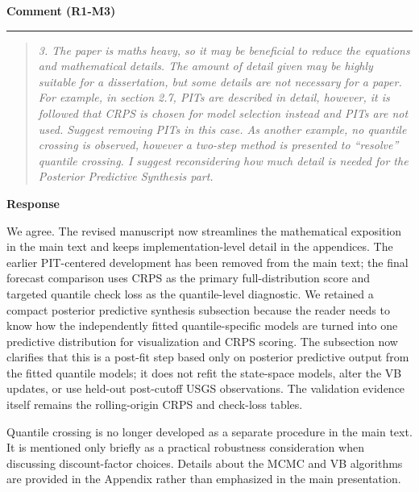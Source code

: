 \documentclass[11pt,letterpaper]{article}
\newcommand{\commentheading}[1]{%
  \vspace{6pt}\noindent\textbf{Comment (#1)}\par
  \vspace{2pt}\hrule\vspace{6pt}
}
\newenvironment{commentblock}{\begin{quote}\small\itshape}{\end{quote}}
\newcommand{\responseheading}{%
  \vspace{2pt}\noindent\textbf{Response}\par
}
\newenvironment{responsebox}{\begin{mdframed}[style=plainbox]}{\end{mdframed}}
\newcommand{\RoneM}[1]{R1-M#1}
\begin{document}
\commentheading{\RoneM{3}}
\begin{commentblock}
3. The paper is maths heavy, so it may be beneficial to reduce the equations and mathematical details. The amount of detail given may be highly suitable for a dissertation, but some details are not necessary for a paper. For example, in section 2.7, PITs are described in detail, however, it is followed that CRPS is chosen for model selection instead and PITs are not used. Suggest removing PITs in this case. As another example, no quantile crossing is observed, however a two-step method is presented to “resolve” quantile crossing. I suggest reconsidering how much detail is needed for the Posterior Predictive Synthesis part.
\end{commentblock}
\responseheading
\begin{responsebox}
We agree. The revised manuscript now streamlines the mathematical exposition in the main text and keeps implementation-level detail in the appendices. The earlier PIT-centered development has been removed from the main text; the final forecast comparison uses CRPS as the primary full-distribution score and targeted quantile check loss as the quantile-level diagnostic. We retained a compact posterior predictive synthesis subsection because the reader needs to know how the independently fitted quantile-specific models are turned into one predictive distribution for visualization and CRPS scoring. The subsection now clarifies that this is a post-fit step based only on posterior predictive output from the fitted quantile models; it does not refit the state-space models, alter the VB updates, or use held-out post-cutoff USGS observations. The validation evidence itself remains the rolling-origin CRPS and check-loss tables.

Quantile crossing is no longer developed as a separate procedure in the main text. It is mentioned only briefly as a practical robustness consideration when discussing discount-factor choices. Details about the MCMC and VB algorithms are provided in the Appendix rather than emphasized in the main presentation.
\end{responsebox}
\end{document}
